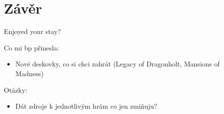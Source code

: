 \chapter{Závěr}

Enjoyed your stay?

Co mi bp přinesla:
\begin{itemize}
    \item Nové deskovky, co si chci zahrát (Legacy of Dragonholt, Mansions of Madness)
\end{itemize}

Otázky:
\begin{itemize}
    \item Dát zdroje k jednotlivým hrám co jen zmiňuju?
\end{itemize}